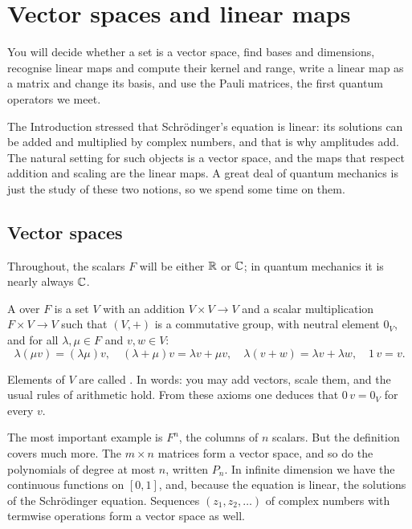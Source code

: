 \section{Vector spaces and linear maps}\label{sec:vector-spaces}

\begin{objectives}
  You will decide whether a set is a vector space, find bases and dimensions, recognise linear maps and compute their kernel and range, write a linear map as a matrix and change its basis, and use the Pauli matrices, the first quantum operators we meet.
\end{objectives}

The Introduction stressed that Schr\"odinger's equation is linear: its solutions can be added and multiplied by complex numbers, and that is why amplitudes add. The natural setting for such objects is a vector space, and the maps that respect addition and scaling are the linear maps. A great deal of quantum mechanics is just the study of these two notions, so we spend some time on them.

\subsection{Vector spaces}

Throughout, the scalars $F$ will be either $\mathbb{R}$ or $\mathbb{C}$; in quantum mechanics it is nearly always $\mathbb{C}$.

\begin{definition}\label{def:vs}
  A  over $F$ is a set $V$ with an addition $V\times V\to V$ and a scalar multiplication $F\times V\to V$ such that $(V,+)$ is a commutative group, with neutral element $0_V$, and for all $\lambda,\mu\in F$ and $v,w\in V$:
  \[
    \lambda(\mu v)=(\lambda\mu)v,\quad (\lambda+\mu)v=\lambda v+\mu v,\quad \lambda(v+w)=\lambda v+\lambda w,\quad 1\,v=v .
  \]
\end{definition}

Elements of $V$ are called . In words: you may add vectors, scale them, and the usual rules of arithmetic hold. From these axioms one deduces that $0\,v=0_V$ for every $v$.

The most important example is $F^n$, the columns of $n$ scalars. But the definition covers much more. The $m\times n$ matrices form a vector space, and so do the polynomials of degree at most $n$, written $P_n$. In infinite dimension we have the continuous functions on $[0,1]$, and, because the equation is linear, the solutions of the Schr\"odinger equation. Sequences $(z_1,z_2,\dots)$ of complex numbers with termwise operations form a vector space as well.

